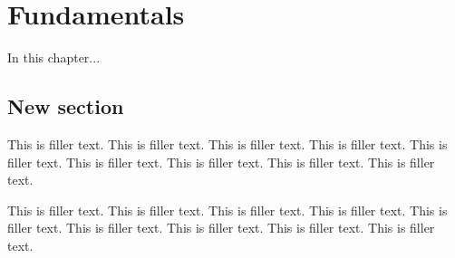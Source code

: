 
\chapter{Fundamentals}\label{chap_02}
\minitoc

\vspace{1cm}


In this chapter...

\section{New section}
This is filler text. This is filler text. This is filler text. This is filler text. This is filler text. This is filler text. This is filler text. This is filler text. This is filler text.

This is filler text. This is filler text. This is filler text. This is filler text. This is filler text. This is filler text. This is filler text. This is filler text. This is filler text.






